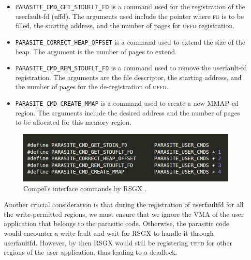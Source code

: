 \documentclass[article, doublespace,nopageskip]{VTthesis} %
\newcommand{\monitor}{RSGX \xspace}
\begin{document}
    \begin{itemize}
        \item \texttt{PARASITE\_CMD\_GET\_STDUFLT\_FD} is a command used for the registration of the userfault-fd (uffd). The arguments used include the pointer where \textsc{fd} is to be filled, the starting address, and the number of pages for \textsc{uffd} registration.
        \item \texttt{PARASITE\_CORRECT\_HEAP\_OFFSET} is a command used to extend the size of the heap. The argument is the number of pages to extend.
        \item \texttt{PARASITE\_CMD\_REM\_STDUFLT\_FD} is a command used to remove the userfault-fd registration. The arguments are the file descriptor, the starting address, and the number of pages for the de-registration of \textsc{uffd}.
        \item \texttt{PARASITE\_CMD\_CREATE\_MMAP} is a command used to create a new MMAP-ed region. The arguments include the desired address and the number of pages to be allocated for this memory region.
    \end{itemize}


    \begin{figure}[htb]
        \centering
        \includegraphics[scale=2.0]{figures/compel-macros.png}
        \caption{Compel's interface commands by \monitor.} 
        \label{fig:comple_interface}
    \end{figure}

    Another crucial consideration is that during the registration of userfaultfd for all the write-permitted regions, we must ensure that we ignore the VMA of the user application that belongs to the parasitic code. Otherwise, the parasitic code would encounter a write fault and wait for \monitor to handle it through userfaultfd. However, by then \monitor would still be registering \textsc{uffd} for other regions of the user application, thus leading  to a deadlock.
\end{document}
